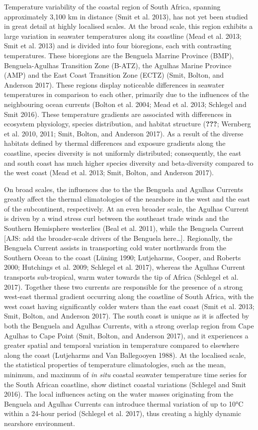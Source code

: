 \documentclass[12pt,a4paper,]{article}
\begin{document}
Temperature variability of the coastal region of South Africa, spanning
approximately 3,100 km in distance (Smit et al. 2013), has not yet been
studied in great detail at highly localised scales. At the broad scale,
this region exhibits a large variation in seawater temperatures along
its coastline (Mead et al. 2013; Smit et al. 2013) and is divided into
four bioregions, each with contrasting temperatures. These bioregions
are the Benguela Marrine Province (BMP), Benguela-Agulhas Transition
Zone (B-ATZ), the Agulhas Marine Province (AMP) and the East Coast
Transition Zone (ECTZ) (Smit, Bolton, and Anderson 2017). These regions
display noticeable differences in seawater temperatures in comparison to
each other, primarily due to the influences of the neighbouring ocean
currents (Bolton et al. 2004; Mead et al. 2013; Schlegel and Smit 2016).
These temperature gradients are associated with differences in ecosystem
physiology, species distribution, and habitat structure ({\textbf{???}};
Wernberg et al. 2010, 2011; Smit, Bolton, and Anderson 2017). As a
result of the diverse habitats defined by thermal differences and
exposure gradients along the coastline, species diversity is not
uniformly distributed; consequently, the east and south coast has much
higher species diversity and beta-diversity compared to the west coast
(Mead et al. 2013; Smit, Bolton, and Anderson 2017).

On broad scales, the influences due to the the Benguela and Agulhas
Currents greatly affect the thermal climatologies of the nearshore in
the west and the east of the subcontinent, respectively. At an even
broader scale, the Agulhas Current is driven by a wind stress curl
between the southeast trade winds and the Southern Hemisphere westerlies
(Beal et al. 2011), while the Benguela Current {[}AJS: add the
broader-scale drivers of the Benguela here\ldots{}{]}. Regionally, the
Benguela Current assists in transporting cold water northwards from the
Southern Ocean to the coast (Lüning 1990; Lutjeharms, Cooper, and
Roberts 2000; Hutchings et al. 2009; Schlegel et al. 2017), whereas the
Agulhas Current transports sub-tropical, warm water towards the tip of
Africa (Schlegel et al. 2017). Together these two currents are
responsible for the presence of a strong west-east thermal gradient
occurring along the coastline of South Africa, with the west coast
having significantly colder waters than the east coast (Smit et al.
2013; Smit, Bolton, and Anderson 2017). The south coast is unique as it
is affected by both the Benguela and Agulhas Currents, with a strong
overlap region from Cape Agulhas to Cape Point (Smit, Bolton, and
Anderson 2017), and it experiences a greater spatial and temporal
variation in temperature compared to elsewhere along the coast
(Lutjeharms and Van Ballegooyen 1988). At the localised scale, the
statistical properties of temperature climatologies, such as the mean,
minimum, and maximum of \emph{in situ} coastal seawater temperature time
series for the South African coastline, show distinct coastal variations
(Schlegel and Smit 2016). The local influences acting on the water
masses originating from the Benguela and Agulhas Currents can introduce
thermal variation of up to 10°C within a 24-hour period (Schlegel et al.
2017), thus creating a highly dynamic nearshore environment.
\end{document}
